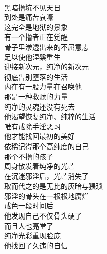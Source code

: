 \begin{poem}[光芒万丈的戒者]
    \begin{multicols}{3}
        \centering~\\
        黑暗撸坑不见天日 \\ 到处是痛苦哀嚎 \\ 这完全是地狱的景象 \\ 有一个撸者正在觉醒 \\ 骨子里渗透出来的不屈意志 \\ 足以使他涅槃重生 \\ 迎接新次元，纯净的新次元 \\ 彻底告别堕落的生活 \\ 内在有一股力量在召唤他 \\ 那是一种救赎的力量 \\ 纯净的灵魂还没有死去 \\ 他渴望恢复纯净、纯粹的生活 \\ 唯有戒除手淫恶习 \\ 他才能找回最初的美好 \\ 依稀记得那个高纯度的自己 \\ 那个不撸的孩子 \\ 周身散发着纯净的光芒 \\ 在沉迷邪淫后，光芒消失了 \\ 取而代之的是无比的灰暗与猥琐 \\ 邪淫的骨头在一根根地腐烂 \\ 戒色一段时间后 \\ 他发现自己不仅骨头硬了 \\ 而且人也亮堂了 \\ 纯净光彩重现脸庞 \\ 他找回了久违的自信
    \end{multicols}
\end{poem}

